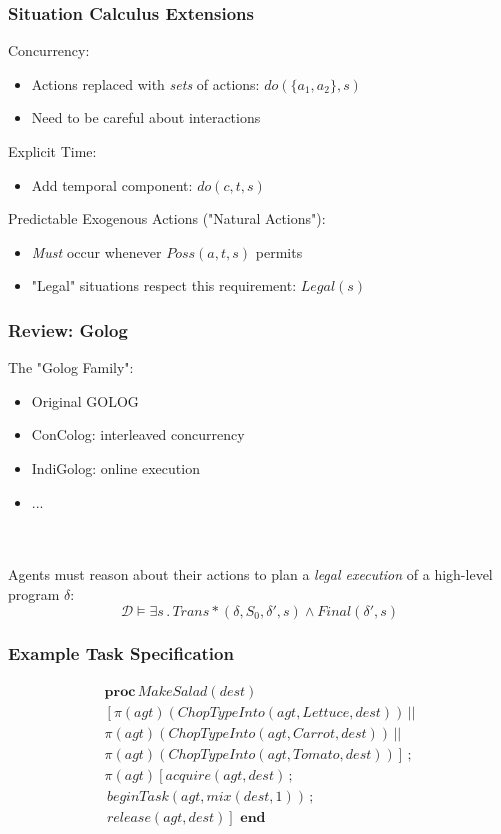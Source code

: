 \documentclass[compress]{beamer}
\begin{document}
\begin{frame}
\frametitle{Situation Calculus Extensions}
Concurrency:
\begin{itemize}
  \item Actions replaced with \emph{sets} of actions: $do(\{a_1,a_2\},s)$
  \item Need to be careful about interactions
\end{itemize}
\pause
Explicit Time:
\begin{itemize}
  \item Add temporal component: $do(c,t,s)$
\end{itemize}
\pause
Predictable Exogenous Actions ("Natural Actions"):
\begin{itemize}
  \item \emph{Must} occur whenever $Poss(a,t,s)$ permits
  \item "Legal" situations respect this requirement: $Legal(s)$
\end{itemize}
\end{frame}

\begin{frame}
\frametitle{Review: Golog}
The "Golog Family":
\begin{itemize}
  \item Original GOLOG
  \item ConColog: interleaved concurrency
  \item IndiGolog: online execution
  \item ...
\end{itemize}
\ \\
\ \\
Agents must reason about their actions to plan a \emph{legal execution} of
a high-level program $\delta$:
\begin{equation*}
\mathcal{D}\models\exists s\,.\,Trans*(\delta,S_0,\delta',s)\wedge Final(\delta',s)
\end{equation*}
\end{frame}

\begin{frame}
\frametitle{Example Task Specification}
\begin{multline*}
\mathbf{proc}\, MakeSalad(dest)\\
\left[\pi(agt)(ChopTypeInto(agt,Lettuce,dest))\,||\right.\\
\pi(agt)(ChopTypeInto(agt,Carrot,dest))\,||\\
\left.\pi(agt)(ChopTypeInto(agt,Tomato,dest))\right]\,;\\
\pi(agt)\left[acquire(agt,dest)\,;\right.\\
\,beginTask(agt,mix(dest,1))\,;\\
\left.\, release(agt,dest)\right]\,\,\mathbf{end}
\end{multline*}
\end{frame}
\end{document}
